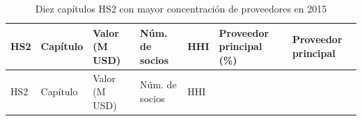 \documentclass[
]{article}
\begin{document}
\begin{longtable}[]{@{}
  >{\raggedright\arraybackslash}p{}
  >{\raggedright\arraybackslash}p{}
  >{\raggedleft\arraybackslash}p{}
  >{\raggedleft\arraybackslash}p{}
  >{\raggedleft\arraybackslash}p{}
  >{\raggedleft\arraybackslash}p{}
  >{\raggedright\arraybackslash}p{}@{}}
\caption{Diez capítulos HS2 con mayor concentración de proveedores en
2015}\tabularnewline
\toprule\noalign{}
\begin{minipage}[b]{\linewidth}\raggedright
HS2
\end{minipage} & \begin{minipage}[b]{\linewidth}\raggedright
Capítulo
\end{minipage} & \begin{minipage}[b]{\linewidth}\raggedleft
Valor (M USD)
\end{minipage} & \begin{minipage}[b]{\linewidth}\raggedleft
Núm. de socios
\end{minipage} & \begin{minipage}[b]{\linewidth}\raggedleft
HHI
\end{minipage} & \begin{minipage}[b]{\linewidth}\raggedleft
Proveedor principal (\%)
\end{minipage} & \begin{minipage}[b]{\linewidth}\raggedright
Proveedor principal
\end{minipage} \\
\midrule\noalign{}
\endfirsthead
\toprule\noalign{}
\begin{minipage}[b]{\linewidth}\raggedright
HS2
\end{minipage} & \begin{minipage}[b]{\linewidth}\raggedright
Capítulo
\end{minipage} & \begin{minipage}[b]{\linewidth}\raggedleft
Valor (M USD)
\end{minipage} & \begin{minipage}[b]{\linewidth}\raggedleft
Núm. de socios
\end{minipage} & \begin{minipage}[b]{\linewidth}\raggedleft
HHI
\end{minipage} & \begin{minipage}[b]{\linewidth}\raggedleft

\end{minipage}
\end{longtable}
\end{document}
